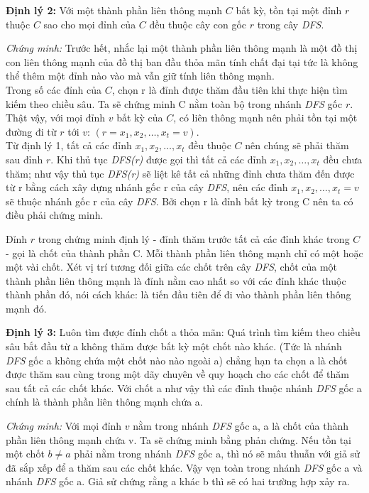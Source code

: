 \documentclass{article}
\begin{document}
\vspace{1em}
\textbf{Định lý 2:} Với một thành phần liên thông mạnh $C$ bất kỳ, tồn tại một đỉnh $r$ thuộc $C$ sao cho mọi đỉnh của $C$ đều thuộc cây con gốc $r$ trong cây \textit{DFS}.

\textit{Chứng minh:} Trước hết, nhắc lại một thành phần liên thông mạnh là một đồ thị con liên thông mạnh của đồ thị ban đầu thỏa mãn tính chất đại tại tức là không thể thêm một đỉnh nào vào mà vẫn giữ tính liên thông mạnh.\\
Trong số các đỉnh của $C$, chọn r là đỉnh được thăm đầu tiên khi thực hiện tìm kiếm theo chiều sâu. Ta sẽ chứng minh C nằm toàn bộ trong nhánh \textit{DFS} gốc $r$.\\
Thật vậy, với mọi đỉnh $v$ bất kỳ của $C$, có liên thông mạnh nên phải tồn tại một đường đi từ $r$ tới $v$: $(r = x_1, x_2, \dots, x_t = v)$.\\
Từ định lý 1, tất cả các đỉnh $x_1, x_2, \dots, x_t$ đều thuộc $C$ nên chúng sẽ phải thăm sau đỉnh $r$. Khi thủ tục \textit{DFS(r)} được gọi thì tất cả các đỉnh $x_1, x_2, \dots, x_t$ đều chưa thăm; như vậy thủ tục \textit{DFS(r)} sẽ liệt kê tất cả những đỉnh chưa thăm đến được từ r bằng cách xây dựng nhánh gốc r của cây \textit{DFS}, nên các đỉnh $x_1, x_2, \dots, x_t = v$ sẽ thuộc nhánh gốc r của cây \textit{DFS}. Bởi chọn r là đỉnh bất kỳ trong C nên ta có điều phải chứng minh.

Đỉnh $r$ trong chứng minh định lý - đỉnh thăm trước tất cả các đỉnh khác trong $C$ - gọi là chốt của thành phần C. Mỗi thành phần liên thông mạnh chỉ có một hoặc một vài chốt. Xét vị trí tương đối giữa các chốt trên cây \textit{DFS}, chốt của một thành phần liên thông mạnh là đỉnh nằm cao nhất so với các đỉnh khác thuộc thành phần đó, nói cách khác: là tiến đầu tiên để đi vào thành phần liên thông mạnh đó.

\vspace{1em}
\textbf{Định lý 3:} Luôn tìm được đỉnh chốt a thỏa mãn: Quá trình tìm kiếm theo chiều sâu bắt đầu từ a không thăm được bất kỳ một chốt nào khác. (Tức là nhánh \textit{DFS} gốc a không chứa một chốt nào nào ngoài a) chẳng hạn ta chọn a là chốt được thăm sau cùng trong một dãy chuyên về quy hoạch cho các chốt để thăm sau tất cả các chốt khác. Với chốt a như vậy thì các đỉnh thuộc nhánh \textit{DFS} gốc a chính là thành phần liên thông mạnh chứa a.

\textit{Chứng minh:} Với mọi đỉnh $v$ nằm trong nhánh \textit{DFS} gốc a, a là chốt của thành phần liên thông mạnh chứa v. Ta sẽ chứng minh bằng phản chứng. Nếu tồn tại một chốt $b \neq a$ phải nằm trong nhánh \textit{DFS} gốc a, thì nó sẽ mâu thuẫn với giả sử đã sắp xếp để a thăm sau các chốt khác. Vậy vẹn toàn trong nhánh \textit{DFS} gốc a và nhánh \textit{DFS} gốc a. Giả sử chứng rằng a khác b thì sẽ có hai trường hợp xảy ra.
\end{document}
